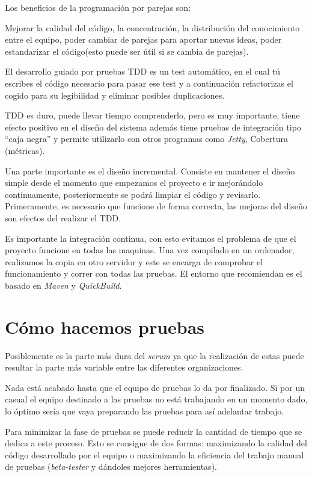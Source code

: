 Los beneficios de la programación por parejas son:

Mejorar la calidad del código, la concentración, la distribución del conocimiento entre el equipo, poder cambiar de parejas para aportar nuevas ideas, poder estandarizar el código(esto puede ser útil si se cambia de parejas).

El desarrollo guiado por pruebas TDD es un test automático, en el cual tú escribes el código necesario para pasar ese test y a continuación refactorizas el cogido para su legibilidad y eliminar posibles duplicaciones.

TDD es duro, puede llevar tiempo comprenderlo, pero es muy importante, tiene efecto positivo en el diseño del sistema además tiene pruebas de integración tipo ``caja negra'' y permite utilizarlo con otros programas como \textit{Jetty}, Cobertura (métricas).

Una parte importante es el diseño incremental. Consiste en mantener el diseño simple desde el momento que empezamos el proyecto e ir mejorándolo continuamente, posteriormente se podrá limpiar el código y revisarlo. Primeramente, es necesario que funcione de forma correcta, las mejoras del diseño son efectos del realizar el TDD.

Es importante la integración continua, con esto evitamos el problema de que el proyecto funcione en todas las maquinas. Una vez compilado en un ordenador, realizamos la copia en otro servidor y este se encarga de comprobar el funcionamiento y correr con todas las pruebas. El entorno que recomiendan es el basado en \textit{Maven} y \textit{QuickBuild}.

\section{Cómo hacemos pruebas}

Posiblemente es la parte más dura del \textit{scrum} ya que la realización de estas puede resultar la parte más variable entre las diferentes organizaciones. 

Nada está acabado hasta que el equipo de pruebas lo da por finalizado. Si por un casual el equipo destinado a las pruebas no está trabajando en un momento dado, lo óptimo sería que vaya preparando las pruebas para así adelantar trabajo.


Para minimizar la fase de pruebas se puede reducir la cantidad de tiempo que se dedica a este proceso. Esto se consigue de dos formas: maximizando la calidad del código desarrollado por el equipo o maximizando la eficiencia del trabajo manual de pruebas (\textit{beta-tester} y dándoles  mejores herramientas).

